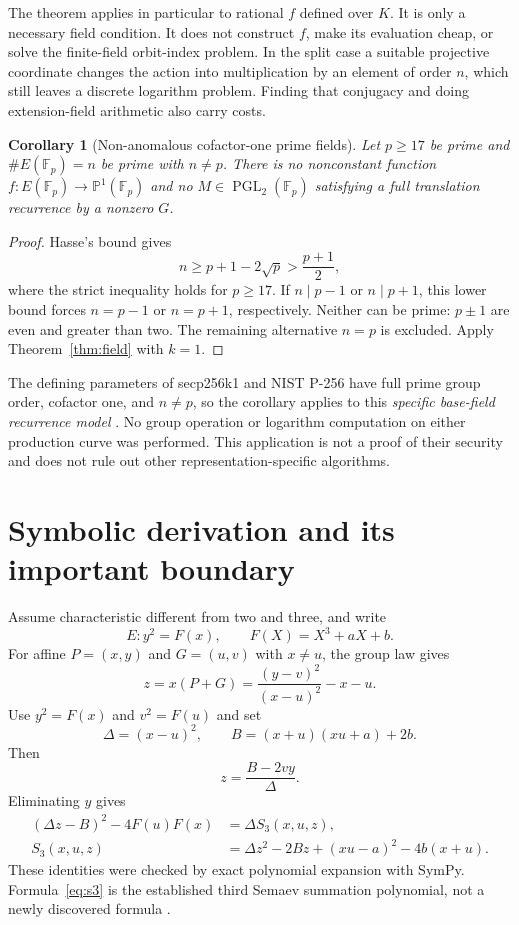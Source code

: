 \documentclass[11pt,letterpaper]{article}
\newtheorem{corollary}[theorem]{Corollary}
\theoremstyle{definition}
\theoremstyle{remark}
\newcommand{\F}{\mathbb F}
\newcommand{\PP}{\mathbb P}
\newcommand{\PGL}{\operatorname{PGL}}
\begin{document}
The theorem applies in particular to rational $f$ defined over $K$. It is only a necessary field condition. It does not construct $f$, make its evaluation cheap, or solve the finite-field orbit-index problem. In the split case a suitable projective coordinate changes the action into multiplication by an element of order $n$, which still leaves a discrete logarithm problem. Finding that conjugacy and doing extension-field arithmetic also carry costs.

\begin{corollary}[Non-anomalous cofactor-one prime fields]\label{cor:prime}
Let $p\ge17$ be prime and $\#E(\F_p)=n$ be prime with $n\ne p$. There is no nonconstant function $f:E(\F_p)\to\PP^1(\F_p)$ and no $M\in\PGL_2(\F_p)$ satisfying a full translation recurrence by a nonzero $G$.
\end{corollary}
\begin{proof}
Hasse's bound \cite{milne} gives
\[
n\ge p+1-2\sqrt p>\frac{p+1}{2},
\]
where the strict inequality holds for $p\ge17$. If $n\mid p-1$ or $n\mid p+1$, this lower bound forces $n=p-1$ or $n=p+1$, respectively. Neither can be prime: $p\pm1$ are even and greater than two. The remaining alternative $n=p$ is excluded. Apply Theorem~\ref{thm:field} with $k=1$.
\end{proof}

The defining parameters of secp256k1 and NIST P-256 have full prime group order, cofactor one, and $n\ne p$, so the corollary applies to this \emph{specific base-field recurrence model} \cite{sec2,nist}. No group operation or logarithm computation on either production curve was performed. This application is not a proof of their security and does not rule out other representation-specific algorithms.

\section{Symbolic derivation and its important boundary}

Assume characteristic different from two and three, and write
\[
E:y^2=F(x),\qquad F(X)=X^3+aX+b.
\]
For affine $P=(x,y)$ and $G=(u,v)$ with $x\ne u$, the group law gives
\[
z=x(P+G)=\frac{(y-v)^2}{(x-u)^2}-x-u.
\]
Use $y^2=F(x)$ and $v^2=F(u)$ and set
\[
\Delta=(x-u)^2,\qquad B=(x+u)(xu+a)+2b.
\]
Then
\begin{equation}\label{eq:add}
z=\frac{B-2vy}{\Delta}.
\end{equation}
Eliminating $y$ gives
\begin{align}
(\Delta z-B)^2-4F(u)F(x)&=\Delta S_3(x,u,z),\label{eq:factor}\\
S_3(x,u,z)&=\Delta z^2-2Bz+(xu-a)^2-4b(x+u).\label{eq:s3}
\end{align}
These identities were checked by exact polynomial expansion with SymPy. Formula~\eqref{eq:s3} is the established third Semaev summation polynomial, not a newly discovered formula \cite{semaev,gal15}.
\end{document}
